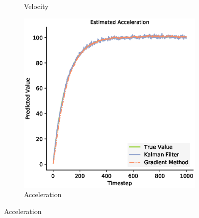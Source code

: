\begin{figure}[H]
\begin{subfigure}{0.33\textwidth}
    \caption{Velocity}
  \end{subfigure}
  \begin{subfigure}{0.33\textwidth}\quad
    \centering
    \includegraphics[width=.8\linewidth]{chapter_3_figures/Estimated_Acceleration_NKF.eps}
    \caption{Acceleration}
  \end{subfigure}
  \medskip


\end{figure}

